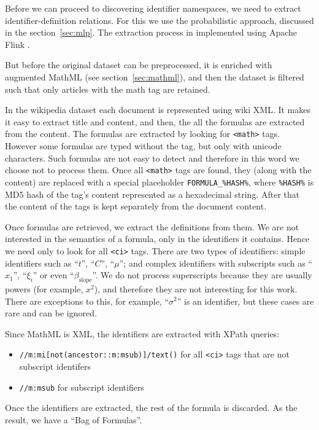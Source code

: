 Before we can proceed to discovering identifier namespaces, we  
need to extract identifier-definition relations. For this we use the probabilistic 
approach, discussed in the section~\ref{sec:mlp}. 
The extraction process in implemented using Apache Flink \cite{flink}.

But before the original dataset can be preprocessed, it is enriched with 
augmented MathML (see section~\ref{sec:mathml}), 
and then the dataset is filtered such that only articles with
the math tag are retained. 

In the wikipedia dataset each document is represented using wiki XML. It 
makes it easy to extract title and content, and then, the all the formulas 
are extracted from the content. The formulas are extracted by 
looking for \verb|<math>| tags. However some formulas are typed without 
the tag, but only with unicode characters. Such formulas are not easy to 
detect and therefore in this word we choose not to process them.
Once all \verb|<math>| tags are found, they (along with the content) 
are replaced with a special placeholder \verb|FORMULA_%HASH%|, where 
\verb|%HASH%| is MD5 hash \cite{rivest1992md5} of the tag's content represented as 
a hexadecimal string. After that 
the content of the tags is kept separately from the document content. 

Once formulas are retrieved, we extract the definitions from them. 
We are not interested in the semantics of a formula, only in the identifiers 
it contains. Hence we need only to look for all \verb|<ci>| tags. 
There are two types of identifiers: simple identifiers such as 
``$t$'', ``$C$'', ``$\mu$''; and complex identifiers with subscripts such as
``$x_1$'', ``$\xi_i$'' or even ``$\beta_{\text{slope}}$''. We do not process 
superscripts because they are usually powers (for example, $x^2$), 
and therefore they are not interesting for this work. 
There are exceptions to this, for example, ``$\sigma^2$'' is an identifier,
but these cases are rare and can be ignored. 

Since MathML is XML, the identifiers are extracted with XPath queries:

\begin{itemize}
  \item \verb|//m:mi[not(ancestor::m:msub)]/text()| for all \verb|<ci>| tags
that are not subscript identifers
  \item \verb|//m:msub| for subscript identifiers
\end{itemize}

Once the identifiers are extracted, the rest of the formula is discarded. 
As the result, we have a ``Bag of Formulas''.

